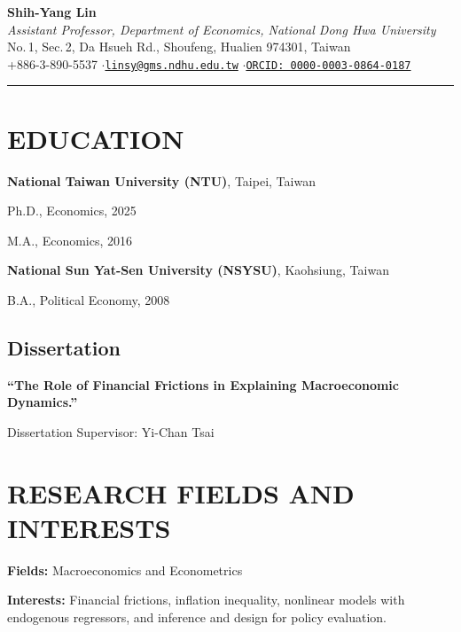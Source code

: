 \documentclass{article}
\newcommand{\cvsection}[1]{\section*{\MakeUppercase{#1}}}
\newcommand{\cvsubsection}[1]{\subsection*{\rmfamily\hspace{1.6em}#1}}
\begin{document}
\begin{center}
    {\LARGE\rmfamily\bfseries Shih-Yang Lin}\\[4pt]
    {\normalsize\rmfamily\itshape Assistant Professor, Department of Economics, National Dong Hwa University}\\[8pt]
    {\small\rmfamily No.\,1, Sec.\,2, Da Hsueh Rd., Shoufeng, Hualien 974301, Taiwan}\\[2pt]
    {\small\rmfamily +886-3-890-5537 \quad$\cdot$\quad \href{mailto:linsy@gms.ndhu.edu.tw}{\texttt{linsy@gms.ndhu.edu.tw}} \quad$\cdot$\quad \href{https://orcid.org/0000-0003-0864-0187}{\texttt{ORCID: 0000-0003-0864-0187}}}
\end{center}
\vspace{6pt}
\noindent\rule{\linewidth}{0.8pt}
\vspace{4pt}

\renewcommand{\arraystretch}{1.25}







\cvsection{Education}
\indent
\textbf{National Taiwan University (NTU)}, Taipei, Taiwan
\begin{cvlist}
    \item Ph.D., Economics, 2025
    \item M.A., Economics, 2016
\end{cvlist}

\textbf{National Sun Yat-Sen University (NSYSU)}, Kaohsiung, Taiwan
\begin{cvlist}
    \item B.A., Political Economy, 2008
\end{cvlist}

\cvsubsection{Dissertation}

\begin{cvlist}
    \item \textbf{“The Role of Financial Frictions in Explaining Macroeconomic Dynamics.”}
    \item Dissertation Supervisor: Yi-Chan Tsai
\end{cvlist}


\cvsection{Research Fields and Interests}

\begin{cvlist}
    \item \textbf{Fields:} Macroeconomics and Econometrics
    \item \textbf{Interests:} Financial frictions, inflation inequality, nonlinear models with endogenous regressors, and inference and design for policy evaluation.
\end{cvlist}
\end{document}
